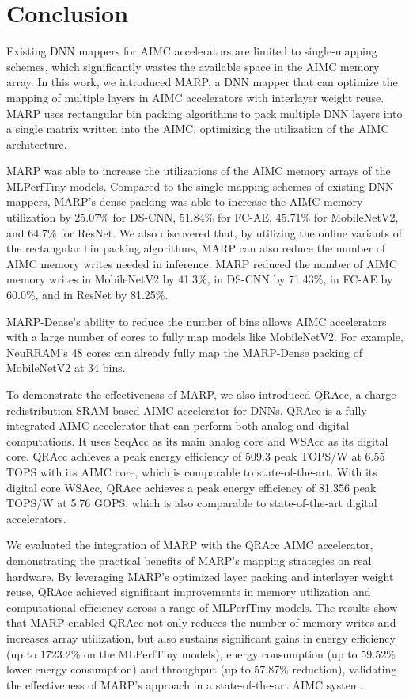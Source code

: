 \chapter{Conclusion}

Existing DNN mappers for AIMC accelerators are limited to single-mapping schemes, which significantly wastes the available space in the AIMC memory array. In this work, we introduced MARP, a DNN mapper that can optimize the mapping of multiple layers in AIMC accelerators with interlayer weight reuse. MARP uses rectangular bin packing algorithms to pack multiple DNN layers into a single matrix written into the AIMC, optimizing the utilization of the AIMC architecture.

MARP was able to increase the utilizations of the AIMC memory arrays of the MLPerfTiny models. Compared to the single-mapping schemes of existing DNN mappers, MARP's dense packing was able to increase the AIMC memory utilization by 25.07\% for DS-CNN, 51.84\% for FC-AE, 45.71\% for MobileNetV2, and 64.7\% for ResNet. 
We also discovered that, by utilizing the online variants of the rectangular bin packing algorithms, MARP can also reduce the number of AIMC memory writes needed in inference. MARP reduced the number of AIMC memory writes in MobileNetV2 by 41.3\%, in DS-CNN by 71.43\%, in FC-AE by 60.0\%, and in ResNet by 81.25\%.

MARP-Dense's ability to reduce the number of bins allows AIMC accelerators with a large number of cores to fully map models like MobileNetV2. For example, NeuRRAM's 48 cores can already fully map the MARP-Dense packing of MobileNetV2 at 34 bins. 

To demonstrate the effectiveness of MARP, we also introduced QRAcc, a charge-redistribution SRAM-based AIMC accelerator for DNNs. QRAcc is a fully integrated AIMC accelerator that can perform both analog and digital computations. It uses SeqAcc as its main analog core and WSAcc as its digital core. QRAcc achieves a peak energy efficiency of 509.3 peak TOPS/W at 6.55 TOPS with its AIMC core, which is comparable to state-of-the-art. With its digital core WSAcc, QRAcc achieves a peak energy efficiency of 81.356 peak TOPS/W at 5.76 GOPS, which is also comparable to state-of-the-art digital accelerators.

We evaluated the integration of MARP with the QRAcc AIMC accelerator, demonstrating the practical benefits of MARP’s mapping strategies on real hardware. By leveraging MARP’s optimized layer packing and interlayer weight reuse, QRAcc achieved significant improvements in memory utilization and computational efficiency across a range of MLPerfTiny models. The results show that MARP-enabled QRAcc not only reduces the number of memory writes and increases array utilization, but also sustains significant gains in energy efficiency (up to 1723.2\% on the MLPerfTiny models), energy consumption (up to 59.52\% lower energy consumption) and throughput (up to 57.87\% reduction), validating the effectiveness of MARP’s approach in a state-of-the-art AIMC system.

